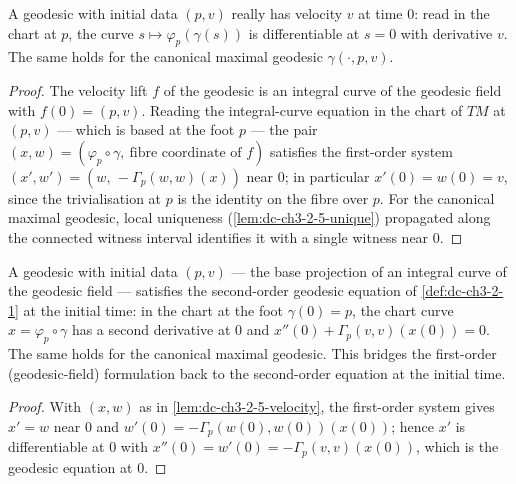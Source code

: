 \begin{lemma}
  \label{lem:dc-ch3-2-5-velocity}


  A geodesic with initial data $(p,v)$ really has velocity $v$ at time $0$: read
  in the chart at $p$, the curve $s\mapsto\varphi_p(\gamma(s))$ is differentiable
  at $s=0$ with derivative $v$. The same holds for the canonical maximal
  geodesic $\gamma(\cdot,p,v)$.
\end{lemma}
\begin{proof}
  \sketch

  The velocity lift $f$ of the geodesic is an integral curve of the geodesic
  field with $f(0)=(p,v)$. Reading the integral-curve equation in the chart of
  $TM$ at $(p,v)$ — which is based at the foot $p$ — the pair
  $(x,w)=(\varphi_p\circ\gamma,\ \text{fibre coordinate of }f)$ satisfies the
  first-order system $(x',w')=(w,\,-\Gamma_p(w,w)(x))$ near $0$; in particular
  $x'(0)=w(0)=v$, since the trivialisation at $p$ is the identity on the fibre
  over $p$. For the canonical maximal geodesic, local uniqueness
  (\cref{lem:dc-ch3-2-5-unique}) propagated along the connected witness interval
  identifies it with a single witness near $0$.
\end{proof}

\begin{lemma}
  \label{lem:dc-ch3-2-5-equation}


  A geodesic with initial data $(p,v)$ — the base projection of an integral
  curve of the geodesic field — satisfies the second-order geodesic equation of
  \cref{def:dc-ch3-2-1} at the initial time: in the chart at the foot
  $\gamma(0)=p$, the chart curve $x=\varphi_p\circ\gamma$ has a second
  derivative at $0$ and $x''(0)+\Gamma_p(v,v)(x(0))=0$. The same holds for the
  canonical maximal geodesic. This bridges the first-order (geodesic-field)
  formulation back to the second-order equation at the initial time.
\end{lemma}
\begin{proof}
  \sketch

  With $(x,w)$ as in \cref{lem:dc-ch3-2-5-velocity}, the first-order system
  gives $x'=w$ near $0$ and $w'(0)=-\Gamma_p(w(0),w(0))(x(0))$; hence $x'$ is
  differentiable at $0$ with
  $x''(0)=w'(0)=-\Gamma_p(v,v)(x(0))$, which is the geodesic equation at $0$.

\end{proof}

